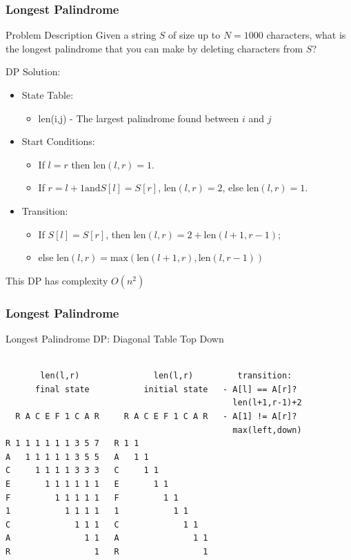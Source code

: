\documentclass{beamer}
\begin{document}
\begin{frame}
  \frametitle{Longest Palindrome}
  {\smaller
    \begin{block}{Problem Description}
      Given a string $S$ of size up to $N = 1000$ characters, what is the
      longest palindrome that you can make by deleting characters from $S$?
    \end{block}

    DP Solution:
    \begin{itemize}
    \item State Table:
      {\smaller
      \begin{itemize}
      \item len(i,j) - The largest palindrome found between $i$ and $j$
      \end{itemize}}
    \item Start Conditions:
      {\smaller
      \begin{itemize}
        \item If $l=r$ then len$(l,r)=1$. 
        \item If $r=l+1 \text{and} S[l]=S[r]$, len$(l,r)=2$, else len$(l,r)=1$.
      \end{itemize}}
    \item Transition:
      {\smaller
      \begin{itemize}
        \item If $S[l]=S[r]$, then len$(l,r)=2+\text{len}(l+1,r-1)$; 
        \item else $\text{len}(l,r) = \text{max}(\text{len}(l+1,r),\text{len}(l,r-1))$
      \end{itemize}}
    \end{itemize}

    This DP has complexity $O(n^2)$

  }
\end{frame}

\begin{frame}[fragile]
  \frametitle{Longest Palindrome}

  Longest Palindrome DP: Diagonal Table Top Down
  
  {\smaller
\begin{verbatim}

       len(l,r)               len(l,r)         transition:
      final state           initial state   - A[l] == A[r]?
                                              len(l+1,r-1)+2
  R A C E F 1 C A R     R A C E F 1 C A R   - A[1] != A[r]?
                                              max(left,down)
R 1 1 1 1 1 1 3 5 7   R 1 1
A   1 1 1 1 1 3 5 5   A   1 1
C     1 1 1 1 3 3 3   C     1 1
E       1 1 1 1 1 1   E       1 1
F         1 1 1 1 1   F         1 1
1           1 1 1 1   1           1 1
C             1 1 1   C             1 1
A               1 1   A               1 1
R                 1   R                 1

\end{verbatim}

  }
\end{frame}
\end{document}
